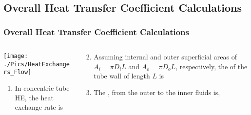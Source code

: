 \documentclass[10pt,compress,handout,ignorenonframetext,unknownkeysallowed]{beamer}
\begin{document}
\subsection{Overall Heat Transfer Coefficient Calculations}

\begin{frame}
  \frametitle{Overall Heat Transfer Coefficient Calculations}
    \begin{columns}
       \begin{column}[l]{0.5\linewidth}
         \texttt{[image: ./Pics/HeatExchangers\_Flow]}
         \begin{enumerate}\scriptsize
            \item<1-> In concentric tube HE, the heat exchange rate is
         \end{enumerate}
       \end{column}
       \begin{column}[l]{0.5\linewidth}
         \begin{enumerate}\setcounter{enumi}{1}\scriptsize
            \item<2-> Assuming internal and outer superficial areas of $A_{i}=\pi D_{i}L$ and $A_{o}=\pi D_{o}L$, respectively, the  of the tube wall of length $L$ is
            \item<3-> The ,  from the outer to the inner fluids is,

\end{enumerate}
\end{column}
\end{columns}
\end{frame}
\end{document}
